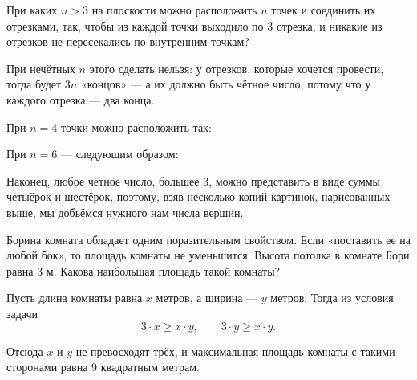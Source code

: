 
\begin{itemize}

	\itB При каких $n>3$ на плоскости можно расположить $n$ точек и соединить их отрезками, так, чтобы из каждой точки выходило по 3 отрезка, и никакие из отрезков не пересекались по внутренним точкам?
	
	\itr При нечётных $n$ этого сделать нельзя: у отрезков, которые хочется провести, тогда будет $3n$ «концов» — а их должно быть чётное число, потому что у каждого отрезка — два конца.
	
	При $n=4$ точки можно расположить так:
	
	\begin{center}  \end{center}
	
	При $n=6$ — следующим образом:
	
	\begin{center}  \end{center}
	
	Наконец, любое чётное число, большее 3, можно представить в виде суммы четыёрок и шестёрок, поэтому, взяв несколько копий картинок, нарисованных выше, мы добьёмся нужного нам числа вершин.

\end{itemize}


\begin{itemize}

	\itA Борина комната обладает одним поразительным свойством. Если «поставить ее на любой бок», то площадь комнаты не уменьшится. Высота потолка в комнате Бори равна 3 м. Какова наибольшая площадь такой комнаты?
	
	\itr Пусть длина комнаты равна $x$ метров, а ширина — $y$ метров. Тогда из условия задачи
	$$3\cdot x \ge x \cdot y,\qquad 3 \cdot y \ge x \cdot y.$$
	
	Отсюда $x$ и $y$ не превосходят трёх, и максимальная площадь комнаты с такими сторонами равна 9 квадратным метрам.

\end{itemize}

